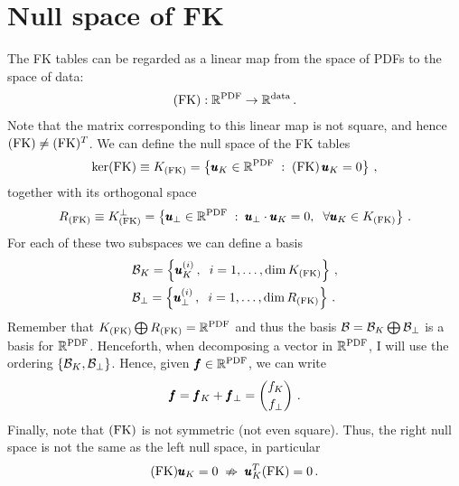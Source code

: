 \section{Null space of FK}
The FK tables can be regarded as a linear map from the space of PDFs to the space of 
data:
\begin{align}
  (\mathrm{FK}) : \mathbb{R}^{\textrm{PDF}} \rightarrow \mathbb{R}^{\textrm{data}} \,.
\end{align}
Note that the matrix corresponding to this linear map is not square, and hence $(\mathrm{FK}) 
\neq (\mathrm{FK})^T$. We can define the null space of the FK tables
\begin{equation}
  \ker (\mathrm{FK}) \equiv K_{(\mathrm{FK})} = 
  \left\{
    \pmb{u}_K \in \mathbb{R}^{\textrm{PDF}} \; : \; (\mathrm{FK}) \, \pmb{u}_K = 0
  \right\} \,,
  \label{eq:ker_FK}
\end{equation}
together with its orthogonal space
\begin{equation}
  R_{(\mathrm{FK})} \equiv K_{(\mathrm{FK})}^{\bot} = 
  \left\{
    \pmb{u}_{\bot} \in \mathbb{R}^{\textrm{PDF}} \; : \; \pmb{u}_{\bot} \cdot \pmb{u}_K = 0,
    \hspace{2mm} \forall \pmb{u}_K \in K_{(\mathrm{FK})}
  \right\}\,.
\end{equation}
For each of these two subspaces we can define a basis
\begin{align}
  & \mathcal{B}_{K} = \left\{ \pmb{u}^{(i)}_{K}\,, \hspace{2mm}  i=1,\dots, \dim K_{(\mathrm{FK})} \right\} \,,\\
  & \mathcal{B}_{\bot} = \left\{ \pmb{u}^{(i)}_{\bot}\,, \hspace{2mm}  i=1,\dots, \dim R_{(\mathrm{FK})} \right\} \,.
  \label{eq:FK_basis}
\end{align}
Remember that $K_{(\mathrm{FK})} \bigoplus R_{(\mathrm{FK})} = \mathbb{R}^{\textrm{PDF}}$ and thus the basis $\mathcal{B} = \mathcal{B}_{K}
\bigoplus \mathcal{B}_{\bot}$ is a basis for $\mathbb{R}^{\textrm{PDF}}$. Henceforth, when decomposing a vector in $\mathbb{R}^{\textrm{PDF}}$, I 
will use the ordering $\left\{ \mathcal{B}_{K}, \mathcal{B}_{\bot} \right\}$. Hence, given $\pmb{f}\in \mathbb{R}^{\textrm{PDF}}$, we can
write
\begin{equation}
  \pmb{f} = \pmb{f}_{K} + \pmb{f}_{\bot} 
          = \begin{pmatrix} 
              f_K \\[2pt]
              f_{\bot}
            \end{pmatrix} \,.
\end{equation}
Finally, note that $(\mathrm{FK})$ is not symmetric (not even square). Thus, the right null space is not the same
as the left null space, in particular
\begin{align}
  (\mathrm{FK}) \pmb{u}_K = 0  \; \nRightarrow \; \pmb{u}_K^T (\mathrm{FK}) = 0 \,.
\end{align}

